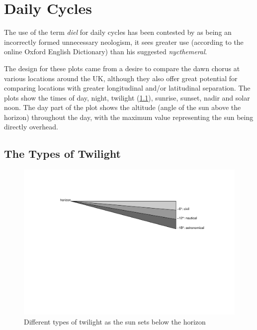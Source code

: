 \documentclass[
]{book}
\begin{document}
\hypertarget{daily-cycles}{%
\section{Daily Cycles}\label{daily-cycles}}

The use of the term \emph{diel} for daily cycles has been contested by \citet{broughton1963} as being an incorrectly formed unnecessary neologism, it sees greater use (according to the online Oxford English Dictionary) than his suggested \emph{nycthemeral}.

The design for these plots came from a desire to compare the dawn chorus at various locations around the UK, although they also offer great potential for comparing locations with greater longitudinal and/or latitudinal separation. The plots show the times of day, night, twilight (\ref{twilight-types}), sunrise, sunset, nadir and solar noon. The day part of the plot shows the altitude (angle of the sun above the horizon) throughout the day, with the maximum value representing the sun being directly overhead.

\hypertarget{twilight-types}{%
\subsection{The Types of Twilight}\label{twilight-types}}

\begin{figure}

{\centering \includegraphics[width=0.9\linewidth]{_main_files/figure-latex/twilights-1} 

}

\caption{Different types of twilight as the sun sets below the horizon}\label{fig:twilights}
\end{figure}
\end{document}
